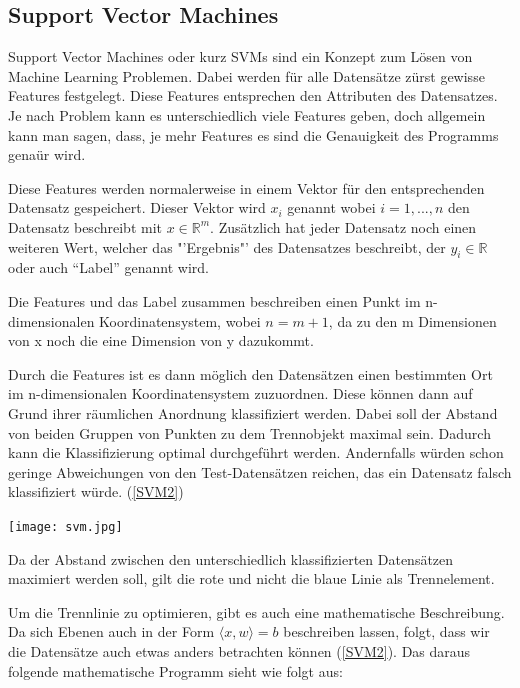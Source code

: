 \subsection{Support Vector Machines}
\author{David Steinmann}
Support Vector Machines oder kurz SVMs sind ein Konzept zum Lösen von Machine Learning Problemen.
Dabei werden für alle Datensätze zürst gewisse Features festgelegt. Diese Features entsprechen den Attributen des Datensatzes. Je nach Problem kann es unterschiedlich viele Features geben, doch allgemein kann man sagen, dass, je mehr Features es sind die Genauigkeit des Programms genaür wird.

Diese Features werden normalerweise in einem Vektor für den entsprechenden Datensatz gespeichert.
Dieser Vektor wird $x_{i}$ genannt wobei $i = 1, ..., n$ den Datensatz beschreibt mit  $x \in  \mathbb{R}^m$.
Zusätzlich hat jeder Datensatz noch einen weiteren Wert, welcher das "'Ergebnis"' des Datensatzes beschreibt, der $y_{i} \in \mathbb{R}$ oder auch "`Label"' genannt wird.

Die Features und das Label zusammen beschreiben einen Punkt im n-dimensionalen Koordinatensystem, wobei $n = m + 1$, da zu den m Dimensionen von x noch die eine Dimension von y dazukommt.

Durch die Features ist es dann möglich den Datensätzen einen bestimmten Ort im n-dimensionalen Koordinatensystem zuzuordnen. Diese können dann auf Grund ihrer räumlichen Anordnung klassifiziert werden. Dabei soll der Abstand von beiden Gruppen von Punkten zu dem Trennobjekt maximal sein. Dadurch kann die Klassifizierung optimal durchgeführt werden. Andernfalls würden schon geringe Abweichungen von den Test-Datensätzen reichen, das ein Datensatz falsch klassifiziert würde. (\ref{SVM2}) 


\begin{dsafigure}
\begin{center}
	\texttt{[image: svm.jpg]}
	\caption{Da der Abstand zwischen den unterschiedlich klassifizierten Datensätzen maximiert werden soll, gilt die rote und nicht die blaue Linie als Trennelement.}
	\label{SVM1}
	\end{center}
\end{dsafigure}


Um die Trennlinie zu optimieren, gibt es auch eine mathematische Beschreibung. Da sich Ebenen auch in der Form $\langle x, w \rangle = b $ beschreiben lassen, folgt, dass wir die Datensätze auch etwas anders betrachten können (\ref{SVM2}).
Das daraus folgende mathematische Programm sieht wie folgt aus: 

